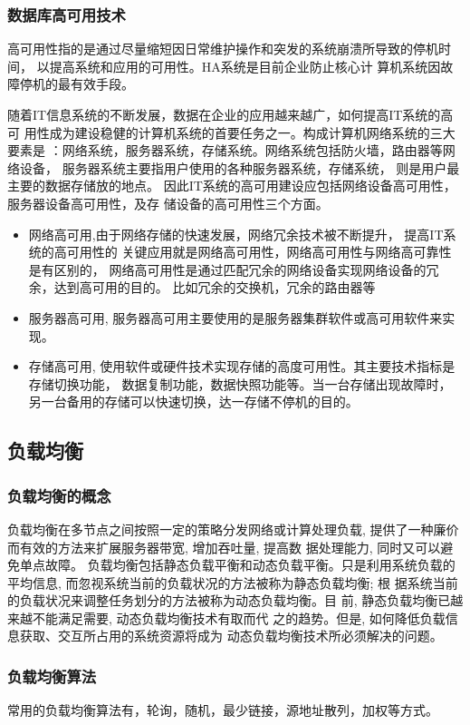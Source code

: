 \subsubsection{数据库高可用技术}
高可用性指的是通过尽量缩短因日常维护操作和突发的系统崩溃所导致的停机时间，
以提高系统和应用的可用性。HA系统是目前企业防止核心计
算机系统因故障停机的最有效手段。

随着IT信息系统的不断发展，数据在企业的应用越来越广，如何提高IT系统的高可
用性成为建设稳健的计算机系统的首要任务之一。构成计算机网络系统的三大要素是
：网络系统，服务器系统，存储系统。网络系统包括防火墙，路由器等网络设备，
服务器系统主要指用户使用的各种服务器系统，存储系统，
则是用户最主要的数据存储放的地点。
因此IT系统的高可用建设应包括网络设备高可用性，服务器设备高可用性，及存
储设备的高可用性三个方面。
\begin{itemize}
\item 网络高可用,由于网络存储的快速发展，网络冗余技术被不断提升，
提高IT系统的高可用性的
关键应用就是网络高可用性，网络高可用性与网络高可靠性是有区别的，
网络高可用性是通过匹配冗余的网络设备实现网络设备的冗余，达到高可用的目的。
比如冗余的交换机，冗余的路由器等
\item 服务器高可用,
服务器高可用主要使用的是服务器集群软件或高可用软件来实现。
\item 存储高可用,
使用软件或硬件技术实现存储的高度可用性。其主要技术指标是存储切换功能，
数据复制功能，数据快照功能等。当一台存储出现故障时，
另一台备用的存储可以快速切换，达一存储不停机的目的。
\end{itemize}
\subsection*{负载均衡}
\subsubsection*{负载均衡的概念}
负载均衡在多节点之间按照一定的策略分发网络或计算处理负载,
提供了一种廉价而有效的方法来扩展服务器带宽, 增加吞吐量, 提高数
据处理能力, 同时又可以避免单点故障。
负载均衡包括静态负载平衡和动态负载平衡。只是利用系统负载的
平均信息, 而忽视系统当前的负载状况的方法被称为静态负载均衡; 根
据系统当前的负载状况来调整任务划分的方法被称为动态负载均衡。目
前, 静态负载均衡已越来越不能满足需要, 动态负载均衡技术有取而代
之的趋势。但是, 如何降低负载信息获取、交互所占用的系统资源将成为
动态负载均衡技术所必须解决的问题。
\subsubsection*{负载均衡算法}
常用的负载均衡算法有，轮询，随机，最少链接，源地址散列，加权等方式。
